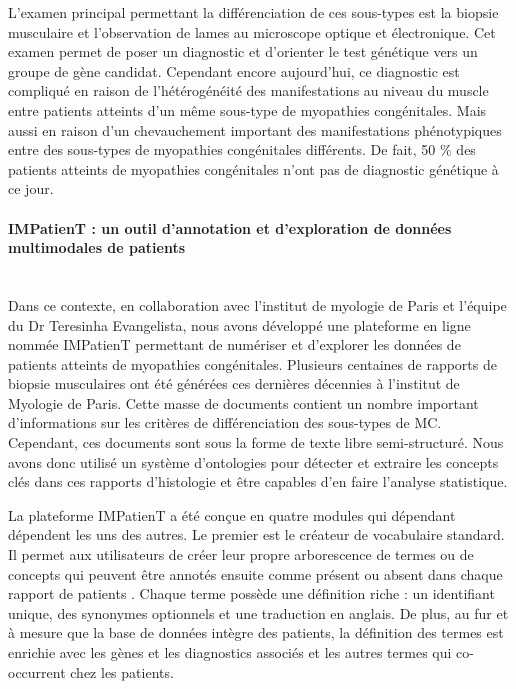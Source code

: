 L’examen principal permettant la différenciation de ces sous-types est la biopsie musculaire et l’observation de lames au microscope optique et électronique. Cet examen permet de poser un diagnostic et d’orienter le test génétique vers un groupe de gène candidat. 
Cependant encore aujourd’hui, ce diagnostic est compliqué en raison de l’hétérogénéité des manifestations au niveau du muscle entre patients atteints d’un même sous-type de myopathies congénitales. Mais aussi en raison d’un chevauchement important des manifestations phénotypiques entre des sous-types de myopathies congénitales différents. De fait, 50 \% des patients atteints de myopathies congénitales n’ont pas de diagnostic génétique à ce jour.  

\paragraph{\textbf{IMPatienT : un outil d’annotation et d’exploration de données multimodales de patients}}\mbox{}\\

Dans ce contexte, en collaboration avec l’institut de myologie de Paris et l’équipe du Dr Teresinha Evangelista, nous avons développé une plateforme en ligne nommée IMPatienT permettant de numériser et d’explorer les données de patients atteints de myopathies congénitales. Plusieurs centaines de rapports de biopsie musculaires ont été générées ces dernières décennies à l’institut de Myologie de Paris. Cette masse de documents contient un nombre important d’informations sur les critères de différenciation des sous-types de MC. Cependant, ces documents sont sous la forme de texte libre semi-structuré. Nous avons donc utilisé un système d’ontologies pour détecter et extraire les concepts clés dans ces rapports d’histologie et être capables d’en faire l’analyse statistique.

La plateforme IMPatienT a été conçue en quatre modules qui dépendant dépendent les uns des autres.
Le premier est le créateur de vocabulaire standard. Il permet aux utilisateurs de créer leur propre arborescence de termes ou de concepts qui peuvent être annotés ensuite comme présent ou absent dans chaque rapport de patients . Chaque terme possède une définition riche : un identifiant unique, des synonymes optionnels et une traduction en anglais. De plus, au fur et à mesure que la base de données intègre des patients, la définition des termes est enrichie avec les gènes et les diagnostics associés et les autres termes qui co-occurrent chez les patients.

